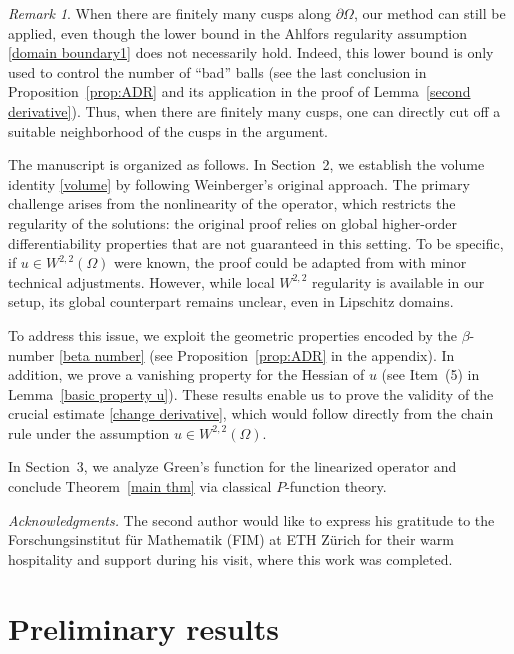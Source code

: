 \documentclass[reqno,11pt]{amsart}
\makeatletter
\numberwithin{equation}{section}
\theoremstyle{remark}
\newtheorem{rem}[thm]{Remark}%
\makeatother
\begin{document}
\begin{rem}
When there are finitely many cusps along $\partial \Omega$, our method can still be applied, even though the lower bound in the
Ahlfors regularity assumption \eqref{domain boundary1} does not necessarily hold. Indeed, this lower bound is only used to
control the number of ``bad'' balls (see the last conclusion in Proposition~\ref{prop:ADR} and its application in the proof of
Lemma~\ref{second derivative}). Thus, when there are finitely many cusps, one can directly cut off a suitable neighborhood of the cusps in the argument.
\end{rem}

\medskip
The manuscript is organized as follows.
In Section~2, we establish the volume identity \eqref{volume} by following Weinberger's original approach. The primary challenge
arises from the nonlinearity of the operator, which restricts the regularity of the solutions: the original proof relies on global
higher-order differentiability properties that are not guaranteed in this setting. To be specific, if $u\in W^{2,2}(\Omega)$
were known, the proof could be adapted from \cite{FZ2025} with minor technical adjustments. However, while local $W^{2,2}$
regularity is available in our setup, its global counterpart remains unclear, even in Lipschitz domains.

To address this issue, we exploit the geometric properties encoded by the $\beta$-number \eqref{beta number}
(see Proposition~\ref{prop:ADR} in the appendix). In addition, we prove a vanishing property for the Hessian of $u$
(see Item~(5) in Lemma~\ref{basic property u}). These results enable us to prove the validity of  the crucial estimate \eqref{change derivative},
which would follow directly from the chain rule under the assumption $u\in W^{2,2}(\Omega)$.

In Section~3, we analyze   Green's function for the linearized operator and conclude Theorem~\ref{main thm} via classical
$P$-function theory.

\medskip
{\noindent \it Acknowledgments.}
The second author would like to express his gratitude to the Forschungsinstitut f\"ur Mathematik (FIM) at ETH Z\"urich for their warm hospitality and support during his visit, where this work was completed.


\section{Preliminary results}
\label{sec:prelim}
\end{document}
